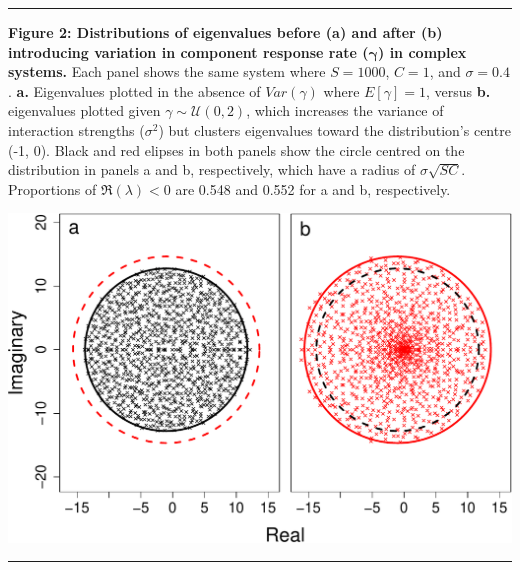 \documentclass[]{article}
\begin{document}
\begin{center}\rule{0.5\linewidth}{\linethickness}\end{center}

\textbf{Figure 2: Distributions of eigenvalues before (a) and after (b)
introducing variation in component response rate
(\(\boldsymbol{\gamma}\)) in complex systems.} Each panel shows the same
system where \(S = 1000\), \(C = 1\), and \(\sigma = 0.4\). \textbf{a.}
Eigenvalues plotted in the absence of \(Var(\gamma)\) where
\(E[\gamma] = 1\), versus \textbf{b.} eigenvalues plotted given
\(\gamma \sim \mathcal{U}(0, 2)\), which increases the variance of
interaction strengths (\(\sigma^{2}\)) but clusters eigenvalues toward
the distribution's centre (-1, 0). Black and red elipses in both panels
show the circle centred on the distribution in panels a and b,
respectively, which have a radius of \(\sigma \sqrt{SC}\). Proportions
of \(\Re(\lambda) < 0\) are 0.548 and 0.552 for a and b, respectively.

\includegraphics{unnamed-chunk-7-1.pdf}

\begin{center}\rule{0.5\linewidth}{\linethickness}\end{center}
\end{document}
